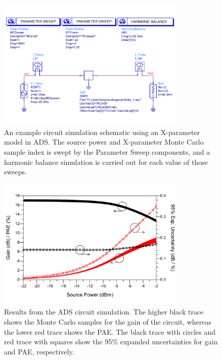 \documentclass[../thesis/thesis.tex]{subfiles}
\begin{document}
\begin{figure}
	\centering
	\includegraphics[width=0.8\textwidth]{fig6}
	\caption[An example circuit simulation schematic using an X-parameter model incorporating uncertainties in ADS.]{An example circuit simulation schematic using an X-parameter model in ADS. The source power and X-parameter Monte Carlo sample index is swept by the Parameter Sweep components, and a harmonic balance simulation is carried out for each value of those sweeps.}
	\label{ch5_fig_schematic}
\end{figure}

\begin{figure}
	\centering
	\includegraphics[width=0.8\textwidth]{fig7}
	\caption[Results from an ADS circuit simulation using an X-parameter model incorporating uncertainties in ADS.]{Results from the ADS circuit simulation. The higher black trace shows the Monte Carlo samples for the gain of the circuit, whereas the lower red trace shows the PAE. The black trace with circles and red trace with squares show the 95\% expanded uncertainties for gain and PAE, respectively.}
	\label{ch5_fig_adsplot}
\end{figure}
\end{document}
